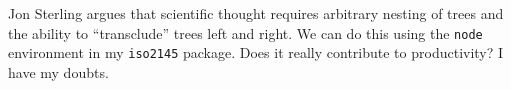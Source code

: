\begin{node}\label{amn-0000}
Jon Sterling argues that scientific thought requires arbitrary nesting
of trees and the ability to ``transclude'' trees left and right. We can
do this using the \verb|node| environment in my \verb|iso2145|
package. Does it really contribute to productivity? I have my doubts.
\end{node}
